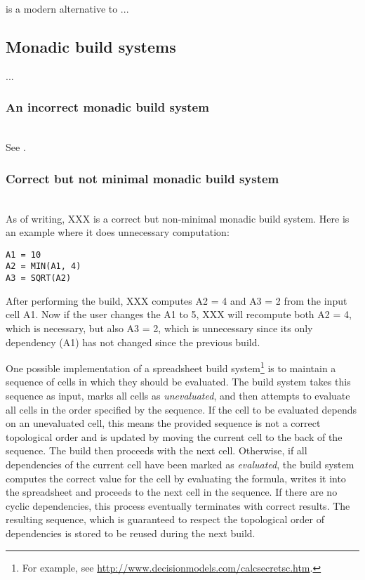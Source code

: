 \Ninja is a modern alternative to \Make ...


\subsection{Monadic build systems}

...
\subsubsection{An incorrect monadic build system}~\\

See .

\subsubsection{Correct but not minimal monadic build system}~\\

As of writing, XXX is a correct but non-minimal monadic build system. Here is
an example where it does unnecessary computation:

\begin{verbatim}
A1 = 10
A2 = MIN(A1, 4)
A3 = SQRT(A2)
\end{verbatim}

After performing the build, XXX computes \textsf{A2 = 4} and \textsf{A3 = 2}
from the input cell \textsf{A1}. Now if the user changes the \textsf{A1} to 5,
XXX will recompute both \textsf{A2 = 4}, which is necessary, but also
\textsf{A3 = 2}, which is unnecessary since its only dependency (\textsf{A1})
has not changed since the previous build.

One possible implementation of a spreadsheet build
system\footnote{For example, see \url{http://www.decisionmodels.com/calcsecretsc.htm}.}
is to maintain a
sequence of cells in which they should be evaluated. The build system takes this
sequence as input, marks all cells as \emph{unevaluated}, and then attempts to
evaluate all cells in the order specified by the sequence. If the cell to be
evaluated depends on an unevaluated cell, this means the provided sequence is
not a correct topological order and is updated by moving the current cell to the
back of the sequence. The build then proceeds with the next cell. Otherwise, if
all dependencies of the current cell have been marked as \emph{evaluated}, the
build system computes the correct value for the cell by evaluating the formula,
writes it into the spreadsheet and proceeds to the next cell in the sequence. If
there are no cyclic dependencies, this process eventually terminates with
correct results. The resulting sequence, which is guaranteed to respect the
topological order of dependencies is stored to be reused during the next build.


